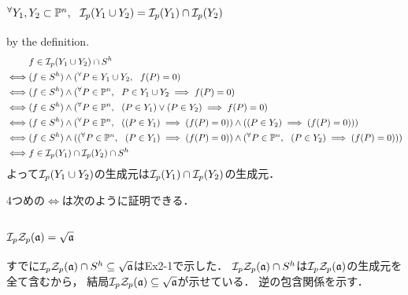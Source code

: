 \documentclass[a4paper]{jarticle}
\newcommand{\I}[1]{\mathfrak{#1}}
\begin{document}
    \subsection{$\Forall{Y_1, Y_2 \subset \proj^n} \defsp(Y_1 \cup Y_2)=\defsp(Y_1) \cap \defsp(Y_2)$}
    by the definition.
    \begin{align*}
        {}&     f \in \defsp(Y_1 \cup Y_2) \cap S^h \\
        \iff&   (f \in S^h) \land (\Forall{P \in Y_1 \cup Y_2} f(P)=0) \\
        \iff&   (f \in S^h) \land (\Forall{P \in \proj^n} P \in Y_1 \cup Y_2 \implies f(P)=0) \\
        \iff&   (f \in S^h) \land (\Forall{P \in \proj^n} (P \in Y_1)  \lor (P \in Y_2) \implies f(P)=0) \\
        \iff&   (f \in S^h) \land (\Forall{P \in \proj^n} ((P \in Y_1) \implies (f(P)=0)) \land ((P \in Y_2) \implies (f(P)=0)))  \\
        \iff&   (f \in S^h) \land ((\Forall{P \in \proj^n} (P \in Y_1) \implies (f(P)=0)) \land (\Forall{P \in \proj^n} (P \in Y_2) \implies (f(P)=0)))  \\
        \iff&   f \in \defsp(Y_1) \cap \defsp(Y_2) \cap S^h
    \end{align*}
    よって$\defsp(Y_1 \cup Y_2)$の生成元は$\defsp(Y_1) \cap \defsp(Y_2)$の生成元．

    4つめの$\iff$は次のように証明できる．
    \begin{prooftree}
    \end{prooftree}

    \subsection{$\defsp \zerosp(\I{a})=\sqrt{\I{a}}$}
    すでに$\defsp \zerosp(\I{a}) \cap S^h \subseteq \sqrt{\I{a}}$はEx2-1で示した．
    $\defsp \zerosp(\I{a}) \cap S^h$は$\defsp \zerosp(\I{a})$の生成元を全て含むから，
    結局$\defsp \zerosp(\I{a}) \subseteq \sqrt{\I{a}}$が示せている．
    逆の包含関係を示す．
\end{document}
